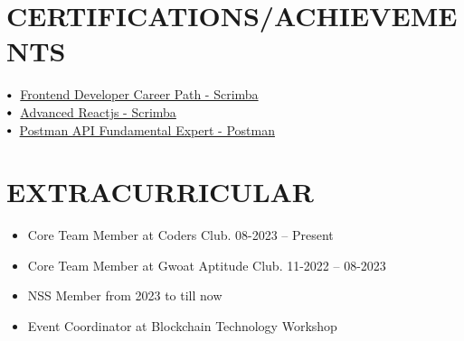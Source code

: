 \documentclass[letterpaper,11pt]{article}
\makeatletter
\newcommand{\resumeItem}[1]{
  \item\small{
    {#1 \vspace{-2pt}}
  }
}
\newcommand{\resumeSubheading}[4]{
  \vspace{-2pt}\item
    \begin{tabular*}{1.0\textwidth}[t]{l@{\extracolsep{\fill}}r}
      \textbf{\large#1} & \textbf{\small #2} \\
      \textit{\large#3} & \textit{\small #4} \\
      
    \end{tabular*}\vspace{-7pt}
}
\newcommand{\resumeSubHeadingListStart}{\begin{itemize}[leftmargin=0.0in, label={}]}
\newcommand{\resumeSubHeadingListEnd}{\end{itemize}}
\newcommand{\resumeItemListStart}{\begin{itemize}}
\newcommand{\resumeItemListEnd}{\end{itemize}\vspace{-5pt}}
\newcommand\sbullet[1][.5]{\mathbin{\vcenter{\hbox{\scalebox{#1}{$\bullet$}}}}}
\makeatother
\begin{document}
\section{CERTIFICATIONS/ACHIEVEMENTS}
\vspace{-5pt}
$\sbullet[.75] \hspace{0.1cm}$ {\href{https://scrimba.com/certificate/uRBW9Kum/gfrontend}{Frontend Developer Career Path - Scrimba}} \hspace{2.59cm}\\
$\sbullet[.75] \hspace{0.1cm}$ {\href{https://scrimba.com/certificate/uRBW9Kum/greact}{Advanced Reactjs - Scrimba}} \hspace{1.6cm}\\
$\sbullet[.75] \hspace{0.2cm}${\href{https://badgr.com/public/assertions/7CDgJ0etTKSyW9Q7IjLYcw} {Postman API Fundamental Expert - Postman}}\hspace{1.6cm}\\





 \section{EXTRACURRICULAR}
    \resumeSubHeadingListStart
        
            \resumeItemListStart
                \resumeItem{\normalsize{Core Team Member at Coders Club.          08-2023 -- Present }}
                \resumeItem{\normalsize{Core Team Member at Gwoat Aptitude Club.          11-2022 -- 08-2023}}
                \resumeItem{\normalsize{NSS Member from 2023 to till now }}\resumeItem{\normalsize{Event Coordinator at Blockchain Technology Workshop}}
            \resumeItemListEnd
    \resumeSubHeadingListEnd
 \vspace{-11pt}
 
 
\end{document}
